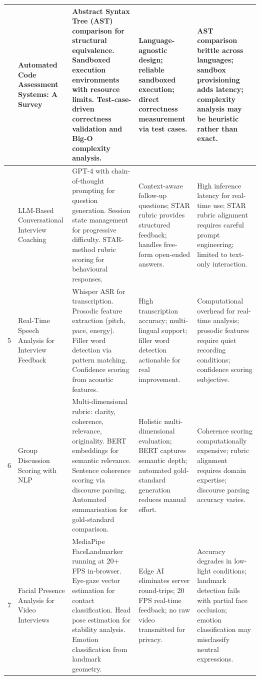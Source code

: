 \documentclass[12pt,a4paper]{report}
\begin{document}
\begin{longtable}{|>{\centering\arraybackslash}p{0.6cm}|p{3.1cm}|p{3.6cm}|p{3.2cm}|p{3.2cm}|}
3 & Automated Code Assessment Systems: A Survey \cite{ref3} &
Abstract Syntax Tree (AST) comparison for structural equivalence. Sandboxed execution environments with resource limits. Test-case-driven correctness validation and Big-O complexity analysis. &
Language-agnostic design; reliable sandboxed execution; direct correctness measurement via test cases. &
AST comparison brittle across languages; sandbox provisioning adds latency; complexity analysis may be heuristic rather than exact. \\
\hline

4 & LLM-Based Conversational Interview Coaching \cite{ref4} &
GPT-4 with chain-of-thought prompting for question generation. Session state management for progressive difficulty. STAR-method rubric scoring for behavioural responses. &
Context-aware follow-up questions; STAR rubric provides structured feedback; handles free-form open-ended answers. &
High inference latency for real-time use; STAR rubric alignment requires careful prompt engineering; limited to text-only interaction. \\
\hline

5 & Real-Time Speech Analysis for Interview Feedback \cite{ref5} &
Whisper ASR for transcription. Prosodic feature extraction (pitch, pace, energy). Filler word detection via pattern matching. Confidence scoring from acoustic features. &
High transcription accuracy; multi-lingual support; filler word detection actionable for real improvement. &
Computational overhead for real-time analysis; prosodic features require quiet recording conditions; confidence scoring subjective. \\
\hline

6 & Group Discussion Scoring with NLP \cite{ref6} &
Multi-dimensional rubric: clarity, coherence, relevance, originality. BERT embeddings for semantic relevance. Sentence coherence scoring via discourse parsing. Automated summarisation for gold-standard comparison. &
Holistic multi-dimensional evaluation; BERT captures semantic depth; automated gold-standard generation reduces manual effort. &
Coherence scoring computationally expensive; rubric alignment requires domain expertise; discourse parsing accuracy varies. \\
\hline

7 & Facial Presence Analysis for Video Interviews \cite{ref7} &
MediaPipe FaceLandmarker running at 20+ FPS in-browser. Eye-gaze vector estimation for contact classification. Head pose estimation for stability analysis. Emotion classification from landmark geometry. &
Edge AI eliminates server round-trips; 20 FPS real-time feedback; no raw video transmitted for privacy. &
Accuracy degrades in low-light conditions; landmark detection fails with partial face occlusion; emotion classification may misclassify neutral expressions. \\
\hline


\end{longtable}
\end{document}
